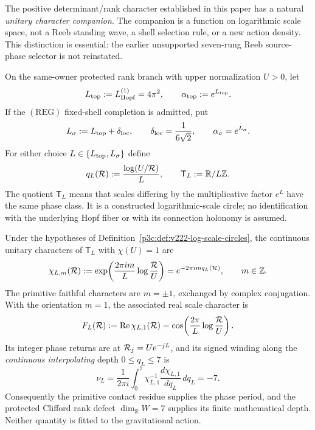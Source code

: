 \documentclass[12pt,a4paper]{article}
\begin{document}
The positive determinant/rank character established in this paper has a
natural \emph{unitary character companion}.  The companion is a function on
logarithmic scale space, not a Reeb standing wave, a shell selection rule,
or a new action density.  This distinction is essential: the earlier
unsupported seven-rung Reeb source-phase selector is not reinstated.

\begin{definition}
\label{p3c:def:v222-log-scale-circles}
On the same-owner protected rank branch with upper normalization $U>0$,
let
\[
  L_{\rm top}:=L_{\mathrm{Hopf}}^{(1)}=4\pi^2,\qquad
  \alpha_{\rm top}:=e^{L_{\rm top}}.
\]
If the $(\mathrm{REG})$ fixed-shell completion is admitted, put
\[
  L_\sigma:=L_{\rm top}+\delta_{\rm loc},\qquad
  \delta_{\rm loc}=\frac1{6\sqrt2},\qquad
  \alpha_\sigma=e^{L_\sigma}.
\]
For either choice $L\in\{L_{\rm top},L_\sigma\}$ define
\[
  q_L(\mathcal R):=\frac{\log(U/\mathcal R)}{L},\qquad
  \mathsf T_L:=\mathbb R/L\mathbb Z.
\]
The quotient $\mathsf T_L$ means that scales differing by the
multiplicative factor $e^L$ have the same phase class.  It is a
constructed logarithmic-scale circle; no identification with the
underlying Hopf fiber or with its connection holonomy is assumed.
\end{definition}

\begin{theorem}
\label{p3c:thm:v222-rank-character-unitary-companion}
Under the hypotheses of Definition~\ref{p3c:def:v222-log-scale-circles},
the continuous unitary characters of $\mathsf T_L$ with $\chi(U)=1$ are
\begin{equation}
\label{p3c:eq:v222-unitary-character-family}
 \chi_{L,m}(\mathcal R)
  :=\exp\!\left(\frac{2\pi i m}{L}\log\frac{\mathcal R}{U}\right)
  =e^{-2\pi i m q_L(\mathcal R)},\qquad m\in\mathbb Z.
\end{equation}
The primitive faithful characters are $m=\pm1$, exchanged by complex
conjugation.  With the orientation $m=1$, the associated real scale
character is
\[
 F_L(\mathcal R):=\operatorname{Re}\chi_{L,1}(\mathcal R)
  =\cos\!\left(\frac{2\pi}{L}\log\frac{\mathcal R}{U}\right).
\]
Its integer phase returns are at $\mathcal R_j=Ue^{-jL}$, and its signed
winding along the \emph{continuous interpolating} depth $0\le q_L\le7$
is
\begin{equation}
\label{p3c:eq:v222-seven-winding}
 \nu_L=\frac1{2\pi i}\int_{0}^{7}
    \chi_{L,1}^{-1}\frac{d\chi_{L,1}}{dq_L}\,dq_L=-7.
\end{equation}
Consequently the primitive contact residue supplies the phase period,
and the protected Clifford rank defect $\dim_{\mathbb R}W=7$
supplies its finite mathematical depth.  Neither quantity is
fitted to the gravitational action.
\end{theorem}
\end{document}
